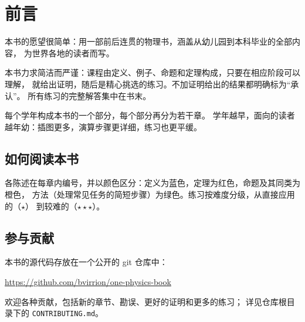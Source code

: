 \chapter{前言}

本书的愿望很简单：用一部前后连贯的物理书，涵盖从幼儿园到本科毕业的全部内容，
为世界各地的读者而写。

本书力求简洁而严谨：课程由定义、例子、命题和定理构成，只要在相应阶段可以理解，
就给出证明，随后是精心挑选的练习。不加证明给出的结果都明确标为“承认”。
所有练习的完整解答集中在书末。

每个学年构成本书的一个部分，每个部分再分为若干章。
学年越早，面向的读者越年幼：插图更多，演算步骤更详细，练习也更平缓。

\section*{如何阅读本书}

各陈述在每章内编号，并以颜色区分：定义为蓝色，定理为红色，命题及其同类为橙色，
方法（处理常见任务的简短步骤）为绿色。练习按难度分级，从直接应用的（$\star$）
到较难的（$\star\star\star$）。

\section*{参与贡献}

本书的源代码存放在一个公开的 git 仓库中：
\begin{center}
\url{https://github.com/bvirrion/one-physics-book}
\end{center}
欢迎各种贡献，包括新的章节、勘误、更好的证明和更多的练习；
详见仓库根目录下的 \texttt{CONTRIBUTING.md}。
